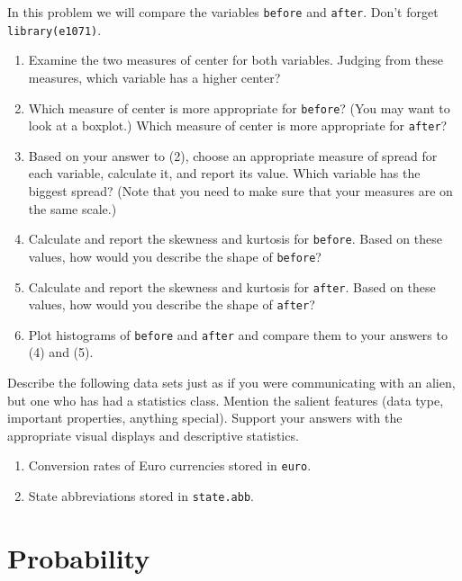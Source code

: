 \documentclass[captions=tableheading]{scrbook}
\begin{document}
\begin{xca}
In this problem we will compare the variables \texttt{before} and \texttt{after}. Don't forget \texttt{library(e1071)}.
\begin{enumerate}
\item Examine the two measures of center for both variables. Judging from these measures, which variable has a higher center?
\item Which measure of center is more appropriate for \texttt{before}? (You may want to look at a boxplot.) Which measure of center is more appropriate for \texttt{after}?
\item Based on your answer to (2), choose an appropriate measure of spread for each variable, calculate it, and report its value. Which variable has the biggest spread? (Note that you need to make sure that your measures are on the same scale.)
\item Calculate and report the skewness and kurtosis for \texttt{before}. Based on these values, how would you describe the shape of \texttt{before}?
\item Calculate and report the skewness and kurtosis for \texttt{after}. Based on these values, how would you describe the shape of \texttt{after}?
\item Plot histograms of \texttt{before} and \texttt{after} and compare them to your answers to (4) and (5).
\end{enumerate}

\end{xca}

\begin{xca}
Describe the following data sets just as if you were communicating with an alien, but one who has had a statistics class. Mention the salient features (data type, important properties, anything special). Support your answers with the appropriate visual displays and descriptive statistics.
\begin{enumerate}
\item Conversion rates of Euro currencies stored in \texttt{euro}.
\item State abbreviations stored in \texttt{state.abb}.
\end{enumerate}

\end{xca}
\chapter{Probability}
\label{sec-4}
\label{cha-Probability}
\end{document}
